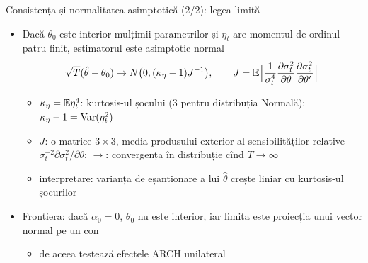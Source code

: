 \begin{frame}{Consistența și normalitatea asimptotică (2/2): legea limită}
\itemsize{\small}
\begin{itemize}
    \item Dacă $\theta_0$ este interior mulțimii parametrilor și $\eta_t$ are momentul de ordinul patru finit, estimatorul este asimptotic normal
    \[ \sqrt T(\hat\theta - \theta_0) \to N\big(0, (\kappa_\eta - 1)J^{-1}\big), \qquad J = \mathbb{E}\Big[\frac{1}{\sigma^4_t}\frac{\partial\sigma^2_t}{\partial\theta}\frac{\partial\sigma^2_t}{\partial\theta'}\Big] \]
    \begin{itemize}
        \item $\kappa_\eta = \mathbb{E}\eta_t^4$: kurtosis-ul șocului ($3$ pentru distribuția Normală); $\kappa_\eta - 1 = \text{Var}(\eta_t^2)$
        \item $J$: o matrice $3 \times 3$, media produsului exterior al sensibilităților relative $\sigma_t^{-2}\partial\sigma^2_t/\partial\theta$; $\to$: convergența în distribuție cînd $T \to \infty$
        \item interpretare: varianța de eșantionare a lui $\hat\theta$ crește liniar cu kurtosis-ul șocurilor
    \end{itemize}
    \item Frontiera: dacă $\alpha_0 = 0$, $\theta_0$ nu este interior, iar limita este proiecția unui vector normal pe un con
    \begin{itemize}
        \item de aceea  testează efectele ARCH unilateral
    \end{itemize}
\end{itemize}
\end{frame}

